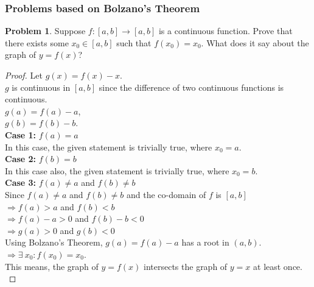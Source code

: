 \documentclass[14]{article}
\theoremstyle{definition}
\newtheorem{prob}{Problem}
\begin{document}
\subsubsection{Problems based on Bolzano's Theorem}
\begin{prob}
Suppose $f:[a,b] \to [a,b]$ is a continuous function. Prove that there exists some $x_0 \in [a, b]$ such that $f(x_0) = x_0$. What does it say about the graph of $y = f(x)$?
\begin{proof}
Let $g(x) = f(x) - x$.\\
$g$ is continuous in $[a, b]$ since the difference of two continuous functions is continuous.\\
$g(a) = f(a) - a$,\\
$g(b) = f(b) - b$.\\
\textbf{Case 1:} $f(a) = a$\\
In this case, the given statement is trivially true, where $x_0 = a$.\\
\textbf{Case 2:} $f(b) = b$\\
In this case also, the given statement is trivially true, where $x_0 = b$.\\
\textbf{Case 3:} $f(a) \neq a$ and $f(b) \neq b$\\
Since $f(a) \neq a$ and $f(b) \neq b$ and the co-domain of $f$ is $[a, b]$\\
$\Rightarrow f(a) > a$ and $f(b) < b$\\
$\Rightarrow f(a) - a > 0$ and $f(b) - b < 0$\\
$\Rightarrow g(a) > 0$ and $g(b) < 0$\\
Using Bolzano's Theorem, $g(a) = f(a) - a$ has a root in $(a, b)$.\\
$\Rightarrow \exists\: x_0 : f(x_0) = x_0$.\\
This means, the graph of $y = f(x)$ intersects the graph of $y = x$ at least once.\\
\end{proof}
\end{prob}
\end{document}
